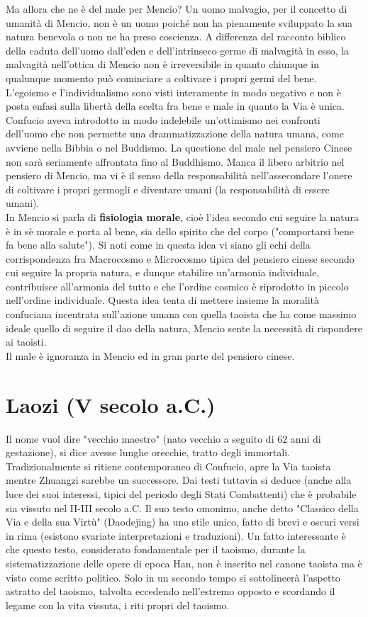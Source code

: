 \documentclass[10pt,a4paper]{report}
\begin{document}
Ma allora che ne è del male per Mencio? Un uomo malvagio, per il concetto di umanità di Mencio, non è un uomo poiché non ha pienamente sviluppato la sua natura benevola o non ne ha preso coscienza. A differenza del racconto biblico della caduta dell'uomo dall'eden e dell'intrinseco germe di malvagità in esso, la malvagità nell'ottica di Mencio non è irreversibile in quanto chiunque in qualunque momento può cominciare a coltivare i propri germi del bene. L'egoismo e l'individualismo sono visti interamente in modo negativo e non è posta enfasi sulla libertà della scelta fra bene e male in quanto la Via è unica. Confucio aveva introdotto in modo indelebile un'ottimismo nei confronti dell'uomo che non permette una drammatizzazione della natura umana, come avviene nella Bibbia o nel Buddismo. La questione del male nel pensiero Cinese non sarà seriamente affrontata fino al Buddhismo. Manca il libero arbitrio nel pensiero di Mencio, ma vi è il senso della responsabilità nell'assecondare l'onere di coltivare i propri germogli e diventare umani (la responsabilità di essere umani).\\
In Mencio si parla di \textbf{fisiologia morale}, cioè l'idea secondo cui seguire la natura è in sè morale e porta al bene, sia dello spirito che del corpo ("comportarsi bene fa bene alla salute"). Si noti come in questa idea vi siano gli echi della corrispondenza fra Macrocosmo e Microcosmo tipica del pensiero cinese secondo cui seguire la propria natura, e dunque stabilire un'armonia individuale, contribuisce all'armonia del tutto e che l'ordine cosmico è riprodotto in piccolo nell'ordine individuale. Questa idea tenta di mettere insieme la moralità confuciana incentrata sull'azione umana con quella taoista che ha come massimo ideale quello di seguire il dao della natura, Mencio sente la necessità di rispondere ai taoisti.\\
Il male è ignoranza in Mencio ed in gran parte del pensiero cinese.
\section{Laozi (V secolo a.C.)}
Il nome vuol dire "vecchio maestro" (nato vecchio a seguito di 62 anni di gestazione), si dice avesse lunghe orecchie, tratto degli immortali.  Tradizionalmente si ritiene contemporaneo di Confucio, apre la Via taoista mentre Zhuangzi sarebbe un successore. Dai testi tuttavia si deduce (anche alla luce dei suoi interessi, tipici del periodo degli Stati Combattenti) che è probabile sia vissuto nel II-III secolo a.C. Il suo testo omonimo, anche detto "Classico della Via e della sua Virtù" (Daodejing) ha uno stile unico, fatto di brevi e oscuri versi in rima (esistono svariate interpretazioni e traduzioni). Un fatto interessante è che questo testo, considerato fondamentale per il taoismo, durante la sistematizzazione delle opere di epoca Han, non è inserito nel canone taoista ma è visto come scritto politico. Solo in un secondo tempo si sottolineerà l'aspetto astratto del taoismo, talvolta eccedendo nell'estremo opposto e scordando il legame con la vita vissuta, i riti propri del taoismo.
\end{document}

